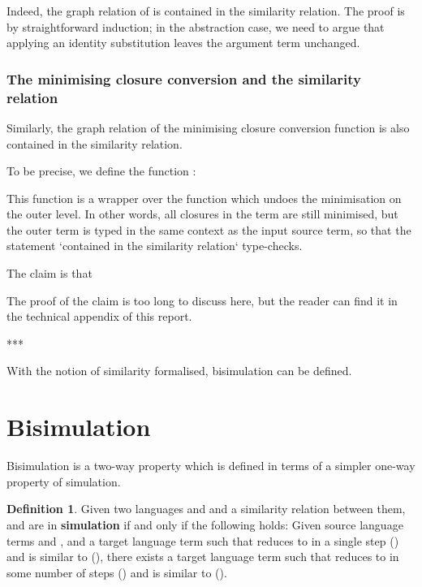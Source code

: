 \documentclass[bsc,frontabs,oneside,singlespacing,parskip,deptreport]{infthesis}
\theoremstyle{definition}
\newtheorem*{definition}{Definition}
\begin{document}

Indeed, the graph relation of  is contained in the
similarity relation. The proof is by straightforward induction; in the
abstraction case, we need to argue that applying an identity
substitution leaves the argument term unchanged.


\subsubsection{The minimising closure conversion and the
  similarity relation}
\label{sec:minim-clos-conv-1}

Similarly, the graph relation of the minimising closure conversion
function is also contained in the similarity relation.

To be precise, we define the function :


This function is a wrapper over the  function which undoes
the minimisation on the outer level. In other words, all closures in
the term are still minimised, but the outer term is typed in the same
context as the input source term, so that the statement `contained in
the similarity relation` type-checks.

The claim is that 


The proof of the claim is too long to discuss here, but the reader can
find it in the technical appendix of this report.

***

With the notion of similarity formalised, bisimulation can be defined.

\section{Bisimulation}

Bisimulation is a two-way property which is defined in terms of a
simpler one-way property of simulation.

\begin{definition}{}
Given two languages  and  and a similarity relation
\AS{\_\textasciitilde\_}
between them,  and  are in \textbf{simulation} if and only
if the following holds:
Given source language terms  and , and a target language
term  such that  reduces to  in a single step () and
 is similar to  (), there exists a target
language term  such that  reduces to  in some
number of steps () and  is similar to  ().
\end{definition}
\end{document}
